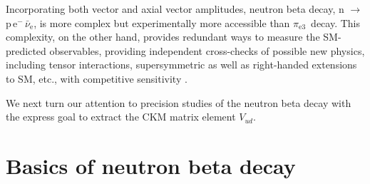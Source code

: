 \documentclass{PoS}
\newcommand{\peiii}{$\pi_{\text{e}3}$}
\begin{document}
Incorporating both vector and axial vector amplitudes, neutron beta
decay, n $\to$ p\,e$^-\,\bar{\nu}_{\text{e}}$, is more complex but
experimentally more accessible than \peiii\ decay.  This complexity, on
the other hand, provides redundant ways to measure the SM-predicted
observables, providing independent cross-checks of possible new physics,
including tensor interactions, supersymmetric as well as right-handed
extensions to SM, etc., with competitive sensitivity \cite{Bae14}.

We next turn our attention to precision studies of the neutron beta
decay with the express goal to extract the CKM matrix element $V_{ud}$.

\section{Basics of neutron beta decay}
\end{document}
